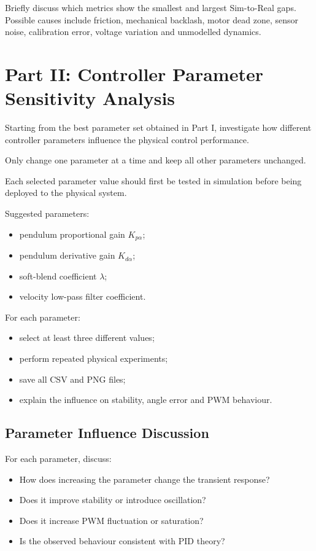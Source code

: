 \documentclass[11pt,a4paper]{article}
\begin{document}
Briefly discuss which metrics show the smallest and largest Sim-to-Real gaps.
Possible causes include friction, mechanical backlash, motor dead zone, sensor
noise, calibration error, voltage variation and unmodelled dynamics.

\section{Part II: Controller Parameter Sensitivity Analysis}
\label{sec:part2}

Starting from the best parameter set obtained in Part I, investigate how
different controller parameters influence the physical control performance.

Only change one parameter at a time and keep all other parameters unchanged.

Each selected parameter value should first be tested in simulation before
being deployed to the physical system.


Suggested parameters:

\begin{itemize}
    \item pendulum proportional gain $K_{p\alpha}$;
    \item pendulum derivative gain $K_{d\alpha}$;
    \item soft-blend coefficient $\lambda$;
    \item velocity low-pass filter coefficient.
\end{itemize}

For each parameter:

\begin{itemize}
    \item select at least three different values;
    \item perform repeated physical experiments;
    \item save all CSV and PNG files;
    \item explain the influence on stability, angle error and PWM behaviour.
\end{itemize}


\subsection{Parameter Influence Discussion}

For each parameter, discuss:

\begin{itemize}
    \item How does increasing the parameter change the transient response?
    \item Does it improve stability or introduce oscillation?
    \item Does it increase PWM fluctuation or saturation?
    \item Is the observed behaviour consistent with PID theory?
\end{itemize}
\end{document}
